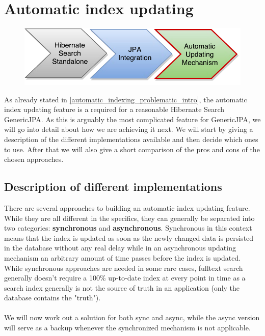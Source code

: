
\section{Automatic index updating} \label{automatic_indexing_chapter}

\begin{figure}[ht]
	\centering
	\includegraphics[scale=0.75]{images/timeline_genericjpa_third.pdf}
	\label{project_timeline_third}
\end{figure}
\noindent
As already stated in \ref{automatic_indexing_problematic_intro}, the automatic index updating feature is a required for a reasonable Hibernate Search GenericJPA. As this is arguably the most complicated feature for GenericJPA, we will go into detail about how we are achieving it next. We will start by giving a description of the different implementations available and then decide which ones to use. After that we will also give a short comparison of the pros and cons of the chosen approaches.

\pagebreak

\subsection{Description of different implementations} \label{description_of_different_implementations}

There are several approaches to building an automatic index updating feature. While they are all different in the specifics, they can generally be separated into two categories: \textbf{synchronous} and \textbf{asynchronous}. Synchronous in this context means that the index is updated as soon as the newly changed data is persisted in the database without any real delay while in an asynchronous updating mechanism an arbitrary amount of time passes before the index is updated. While synchronous approaches are needed in some rare cases, fulltext search generally doesn't require a 100\% up-to-date index at every point in time  as a search index generally is not the source of truth in an application (only the database contains the "truth").
\\\\
We will now work out a solution for both sync and async, while the async version will serve as a backup whenever the synchronized mechanism is not applicable.

